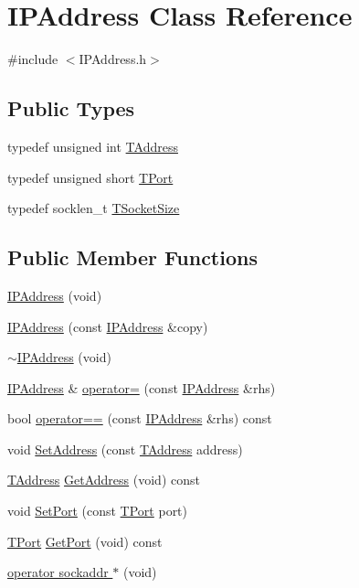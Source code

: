 \hypertarget{class_i_p_address}{\section{I\-P\-Address Class Reference}
\label{class_i_p_address}
}


{\ttfamily \#include $<$I\-P\-Address.\-h$>$}

\subsection*{Public Types}
\begin{DoxyCompactItemize}
\item 
typedef unsigned int \hyperlink{class_i_p_address_a36831f63346275f44e8747d77a2a5d51}{T\-Address}
\item 
typedef unsigned short \hyperlink{class_i_p_address_a51188195685c31d4258c0a078cc37154}{T\-Port}
\item 
typedef socklen\-\_\-t \hyperlink{class_i_p_address_a28c76ca7e5d4aa86d2caf0b742a23cdb}{T\-Socket\-Size}
\end{DoxyCompactItemize}
\subsection*{Public Member Functions}
\begin{DoxyCompactItemize}
\item 
\hyperlink{class_i_p_address_a1333231aa0a638d7d730a5c89ae868c9}{I\-P\-Address} (void)
\item 
\hyperlink{class_i_p_address_a9b64b50f64853fd06487c77e0baaaf4a}{I\-P\-Address} (const \hyperlink{class_i_p_address}{I\-P\-Address} \&copy)
\item 
\hyperlink{class_i_p_address_a877ef12fd67c5064b7188a95e570a28b}{$\sim$\-I\-P\-Address} (void)
\item 
\hyperlink{class_i_p_address}{I\-P\-Address} \& \hyperlink{class_i_p_address_adebc20befea4d99f6ffd058d999480b2}{operator=} (const \hyperlink{class_i_p_address}{I\-P\-Address} \&rhs)
\item 
bool \hyperlink{class_i_p_address_acaa3d485fedf874453d3fd0ab7e93a64}{operator==} (const \hyperlink{class_i_p_address}{I\-P\-Address} \&rhs) const 
\item 
void \hyperlink{class_i_p_address_ade47d25d834bfb952fcf7fb2867db21e}{Set\-Address} (const \hyperlink{class_i_p_address_a36831f63346275f44e8747d77a2a5d51}{T\-Address} address)
\item 
\hyperlink{class_i_p_address_a36831f63346275f44e8747d77a2a5d51}{T\-Address} \hyperlink{class_i_p_address_a00ed9d09c9ec8f1d9568466683606e55}{Get\-Address} (void) const 
\item 
void \hyperlink{class_i_p_address_a5908d6242879f0e45685f8b0734dafa7}{Set\-Port} (const \hyperlink{class_i_p_address_a51188195685c31d4258c0a078cc37154}{T\-Port} port)
\item 
\hyperlink{class_i_p_address_a51188195685c31d4258c0a078cc37154}{T\-Port} \hyperlink{class_i_p_address_a92d27804d27e1fef93afd0137fe4eb08}{Get\-Port} (void) const 
\item 
\hyperlink{class_i_p_address_ac7a02f2b922b3b3c929ae3ad079ac8e9}{operator sockaddr $\ast$} (void)
\end{DoxyCompactItemize}
